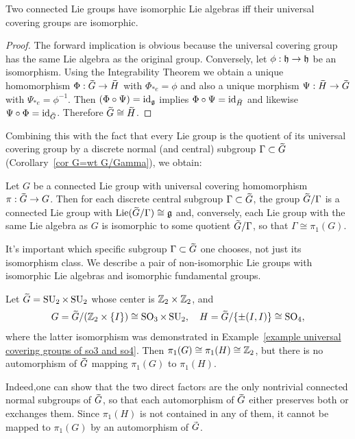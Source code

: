 \begin{thm}[{{\cite[Thm.~9.5.13]{HN}}}]
    Two connected Lie groups have isomorphic Lie algebras iff their universal covering groups are isomorphic.
\end{thm}
\begin{proof}
    The forward implication is obvious because the universal covering group has the same Lie algebra as the original group. Conversely, let $\phi:\mathfrak{h}\to \mathfrak{h}$ be an isomorphism. Using the Integrability Theorem we obtain a unique homomorphism $\Phi:\wt{G}\to \wt{H}$ with $\Phi_{\ast e}=\phi$ and also a unique morphism $\Psi:\wt{H}\to \wt{G}$ with $\Psi_{\ast e}=\phi^{-1}$. Then $(\Phi\circ\Psi)=\operatorname{id}_{\mathfrak{g}}$ implies  $\Phi\circ\Psi=\id_{\wt H}$ and likewise $\Psi\circ\Phi=\id_{\wt G}$. Therefore $\wt{G}\cong \wt{H}$.
\end{proof}
Combining this with the fact that every Lie group is the quotient of its universal covering group by a discrete normal (and central) subgroup $\Gamma\subset \wt{G}$ (Corollary~\ref{cor G=wt G/Gamma}), we obtain:

\begin{cor}
    Let $G$ be a connected Lie group with universal covering homomorphism $\pi:\wt{G}\to G$. Then for each discrete central subgroup $\Gamma\subset \wt G$, the group $\wt{G}\slash\Gamma$ is a connected Lie group with $\Lief (\wt{G}\slash \Gamma)\cong \frakg$  and, conversely, each Lie group with the same Lie algebra as $G$ is isomorphic to some quotient $\wt{G}\slash \Gamma$, so that $\Gamma\cong \pi_1(G)$.
\end{cor}

\begin{example}
    It's important which specific subgroup $\Gamma\subset \wt{G}$ one chooses, not just its isomorphism class.
    We describe a pair of non-isomorphic Lie groups with isomorphic Lie algebras and isomorphic fundamental groups.

    Let $\wt{G}=\SU_2\times \SU_2$ whose center is $\mathbb{Z}_2\times\mathbb{Z}_2$, and 
    \[G=\wt{G}\slash (\bbZ_2\times \{I\})\cong \SO_3\times \SU_2,\quad H=\wt{G}\slash \{\pm (I,I)\}\cong \SO_4,\]
    where the latter isomorphism was demonstrated in Example~\ref{example universal covering groups of so3 and so4}. Then $\pi_1(G)\cong \pi_1(H)\cong \mathbb{Z}_2$, but there is no automorphism of $\wt{G}$ mapping $\pi_1(G)$ to $\pi_1(H)$.

    Indeed,one can show that the two direct factors are the only nontrivial connected normal subgroups of $\wt{G}$, so that each automorphism of $\wt{G}$ either preserves both or exchanges them. Since $\pi_1(H)$ is not contained in any of them, it cannot be mapped to $\pi_1(G)$ by an automorphism of $\wt G$.
\end{example}

